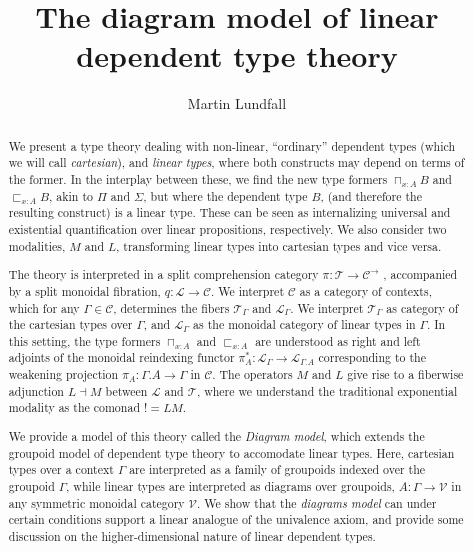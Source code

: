 \documentclass[a4paper,english]{lipics-v2018}
\title{The diagram model of linear dependent type theory}
\author{Martin Lundfall}{Stockholm University}{martin@dapp.org}{}{}%
\begin{document}
\maketitle

\begin{abstract}
We present a type theory dealing with non-linear, ``ordinary'' dependent types (which we will call \textit{cartesian}), and \textit{linear types}, where both constructs may depend on terms of the former. In the interplay between these, we find the new type formers $\sqcap_{x : A}B$ and $\sqsubset_{x : A}B$, akin to $\Pi$ and $\Sigma$, but where the dependent type $B$, (and therefore the resulting construct) is a linear type. These can be seen as internalizing universal and existential quantification over linear propositions, respectively. We also consider two modalities, $M$ and $L$, transforming linear types into cartesian types and vice versa.

The theory is interpreted in a split comprehension category $\pi : \mathcal{T} \to \mathcal{C}^\to$ \cite{jacobs}, accompanied by a split monoidal fibration, $q : \mathcal{L} \to \mathcal{C}$. We interpret $\mathcal{C}$ as a category of contexts, which for any $\Gamma \in \mathcal{C}$, determines the fibers $\mathcal{T}_\Gamma$ and $\mathcal{L}_\Gamma$. We interpret $\mathcal{T}_\Gamma$ as category of the cartesian types over $\Gamma$, and $\mathcal{L}_\Gamma$ as the monoidal category of linear types in $\Gamma$. In this setting, the type formers $\sqcap_{x :A}$ and $\sqsubset_{x : A}$ are understood as right and left adjoints of the monoidal reindexing functor $\pi_A^* : \mathcal{L}_\Gamma \to \mathcal{L}_{\Gamma.A}$ corresponding to the weakening projection $\pi_A : \Gamma.A \to \Gamma$ in $\mathcal{C}$. The operators $M$ and $L$ give rise to a fiberwise adjunction $L \dashv M$ between $\mathcal{L}$ and $\mathcal{T}$, where we understand the traditional exponential modality as the comonad $! = LM$.

We provide a model of this theory called the \textit{Diagram model}, which extends the groupoid model of dependent type theory \cite{hofmann1998} to accomodate linear types. Here, cartesian types over a context $\Gamma$ are interpreted as a family of groupoids indexed over the groupoid $\Gamma$, while linear types are interpreted as diagrams over groupoids, $A : \Gamma \to \mathcal{V}$ in any symmetric monoidal category $\mathcal{V}$. We show that the \textit{diagrams model} can under certain conditions support a linear analogue of the univalence axiom, and provide some discussion on the higher-dimensional nature of linear dependent types.
\end{abstract}


\end{document}
